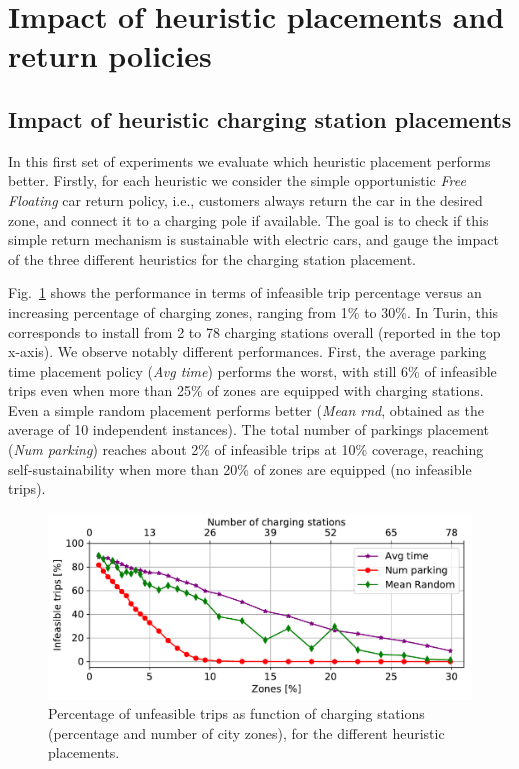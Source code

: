 \section{Impact of heuristic placements and return policies}
\label{sec:7_6_heurstic_placement}





\subsection{Impact of heuristic charging station placements}

In this first set of experiments we evaluate which heuristic placement performs better.
Firstly, for each heuristic we consider the simple opportunistic \textit{Free Floating} car return policy, i.e., customers always return the car in the desired zone, and connect it to a charging pole if available. The goal is to check if this simple return mechanism is sustainable with electric cars, and gauge the impact of the three different heuristics for the charging station placement.
 
Fig.~\ref{fig:deathsVsZones_algorithm} shows the performance in terms of infeasible trip percentage versus an increasing percentage of charging zones, ranging from  1\% to 30\%. In Turin, this corresponds to install from 2 to 78 charging stations overall (reported in the top x-axis).
We observe notably different performances. First, the average parking time placement policy (\textit{Avg time}) performs the worst, with still 6\% of infeasible trips even when  more than 25\% of zones are equipped with charging stations. Even a simple random placement performs better (\textit{Mean rnd}, obtained as the average of 10 independent instances). The total number of parkings placement (\textit{Num parking}) reaches about 2\% of infeasible trips at 10\% coverage, reaching self-sustainability when more than 20\% of zones are equipped (no infeasible trips).

\begin{figure}[ht]
	\centering
	\includegraphics[width=0.9\columnwidth]{figures/Torino_FF_deaths_probs.pdf}
	\caption{Percentage of unfeasible trips as function of charging stations (percentage and number of city zones), for the different heuristic placements.}
	\label{fig:deathsVsZones_algorithm}
\end{figure}

